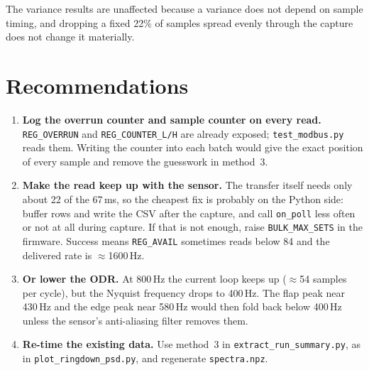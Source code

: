 \documentclass[11pt]{article}
\newcommand{\code}[1]{\texttt{#1}}
\begin{document}
The variance results are unaffected because a variance does not depend on
sample timing, and dropping a fixed 22\% of samples spread evenly through
the capture does not change it materially.

\section{Recommendations}
\label{sec:recs}

\begin{enumerate}
  \item \textbf{Log the overrun counter and sample counter on every read.}
        \code{REG\_OVERRUN} and \code{REG\_COUNTER\_L/H} are already exposed;
        \code{test\_modbus.py} reads them. Writing the counter into each
        batch would give the exact position of every sample and remove the
        guesswork in method~3.
  \item \textbf{Make the read keep up with the sensor.} The transfer itself
        needs only about 22 of the 67\,ms, so the cheapest fix is probably on
        the Python side: buffer rows and write the CSV after the capture,
        and call \code{on\_poll} less often or not at all during capture. If
        that is not enough, raise \code{BULK\_MAX\_SETS} in the firmware.
        Success means \code{REG\_AVAIL} sometimes reads below 84 and the
        delivered rate is $\approx$1600\,Hz.
  \item \textbf{Or lower the ODR.} At 800\,Hz the current loop keeps up
        ($\approx$54 samples per cycle), but the Nyquist frequency drops to
        400\,Hz. The flap peak near 430\,Hz and the edge peak near 580\,Hz
        would then fold back below 400\,Hz unless the sensor's
        anti-aliasing filter removes them.
  \item \textbf{Re-time the existing data.} Use method~3 in
        \code{extract\_run\_summary.py}, as in \code{plot\_ringdown\_psd.py},
        and regenerate \code{spectra.npz}.
\end{enumerate}
\end{document}
